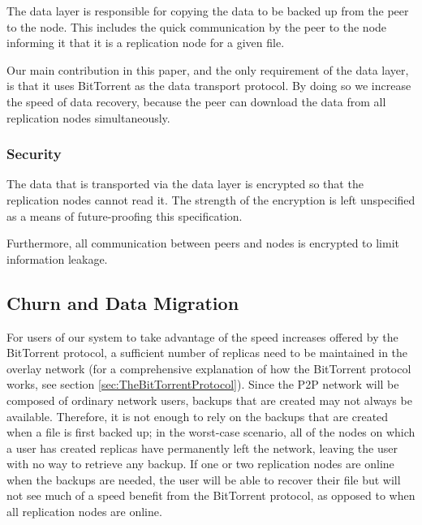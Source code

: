 \documentclass[12pt]{report}
\begin{document}
The data layer is responsible for copying the data to be backed up from the peer to the node. This includes the quick communication by the peer to the node informing it that it is a replication node for a given file.

Our main contribution in this paper, and the only requirement of the data layer, is that it uses BitTorrent as the data transport protocol. By doing so we increase the speed of data recovery, because the peer can download the data from all replication nodes simultaneously.

\subsubsection{Security}

The data that is transported via the data layer is encrypted so that the replication nodes cannot read it. The strength of the encryption is left unspecified as a means of future-proofing this specification.

Furthermore, all communication between peers and nodes is encrypted to limit information leakage.

\subsection{Churn and Data Migration} \label{sec:ChurnandDataMigration_DataExchange}

For users of our system to take advantage of the speed increases offered by the BitTorrent protocol, a sufficient number of replicas need to be maintained in the overlay network (for a comprehensive explanation of how the BitTorrent protocol works, see section \ref{sec:TheBitTorrentProtocol}). Since the P2P network will be composed of ordinary network users, backups that are created may not always be available. Therefore, it is not enough to rely on the backups that are created when a file is first backed up; in the worst-case scenario, all of the nodes on which a user has created replicas have permanently left the network, leaving the user with no way to retrieve any backup. If one or two replication nodes are online when the backups are needed, the user will be able to recover their file but will not see much of a speed benefit from the BitTorrent protocol, as opposed to when all replication nodes are online.
\end{document}
